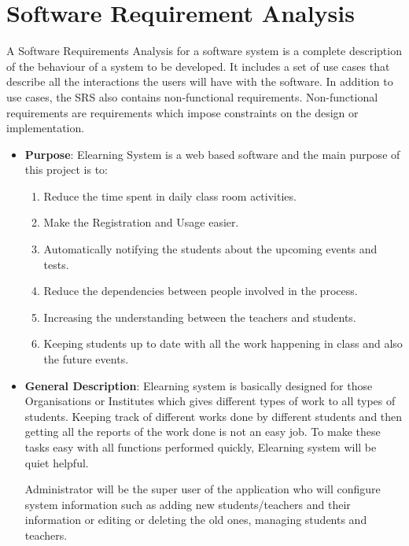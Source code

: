 \section{Software Requirement Analysis}
A Software Requirements Analysis for a software system is a complete 
description of the behaviour of a system to be developed. It includes 
a set of use cases that describe all the interactions the users will 
have with the software. In addition to use cases, the SRS also contains 
non-functional requirements. Non-functional requirements are 
requirements which impose constraints on the design or implementation.
\begin{itemize}
\item{\bf Purpose}: Elearning System is a web based software and the 
main purpose of this project is to:
\begin{enumerate}
\item Reduce the time spent in daily class room activities.
\item Make the Registration and Usage easier.
\item Automatically notifying the students about the upcoming events and tests.
\item Reduce the dependencies between people involved in the process.
\item Increasing the understanding between the teachers and students.
\item Keeping students up to date with all the work happening in class and also the future    events.
\end{enumerate}
\item{\bf General Description}: Elearning system is basically 
designed for those Organisations or Institutes which gives different 
types of work to all types of students. Keeping track of different 
works done by different students and then getting all the reports of 
the work done is not an easy job. To make these tasks easy with all 
functions performed quickly, Elearning system will be quiet helpful.

Administrator will be the super user of the application who will 
configure system information such as adding new students/teachers and their 
information or editing or deleting the old ones, managing students and teachers.


\end{itemize}
